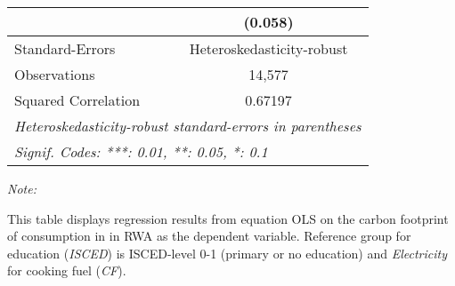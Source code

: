 \begin{table}[htbp!]
\begin{adjustbox}{width = 1\textwidth, max height = 0.95\textheight, center}
\begin{threeparttable}[b]
\begin{tabular}{lc}
                                & (0.058)\\   
            \midrule 
            Standard-Errors     & Heteroskedasticity-robust \\   
            Observations        & 14,577\\  
            Squared Correlation & 0.67197\\  
            \midrule \midrule
            \multicolumn{2}{l}{\emph{Heteroskedasticity-robust standard-errors in parentheses}}\\
            \multicolumn{2}{l}{\emph{Signif. Codes: ***: 0.01, **: 0.05, *: 0.1}}\\
         \end{tabular}
         
         \begin{tablenotes}\item \medskip \textit{Note:}
            \item This table displays regression results from equation OLS on the carbon footprint of consumption in  in RWA as the dependent variable.  Reference group for education (\textit{ISCED}) is ISCED-level 0-1 (primary or no education) and \textit{Electricity} for cooking fuel (\textit{CF}).
         \end{tablenotes}
      \end{threeparttable}
   \end{adjustbox}
\end{table}


